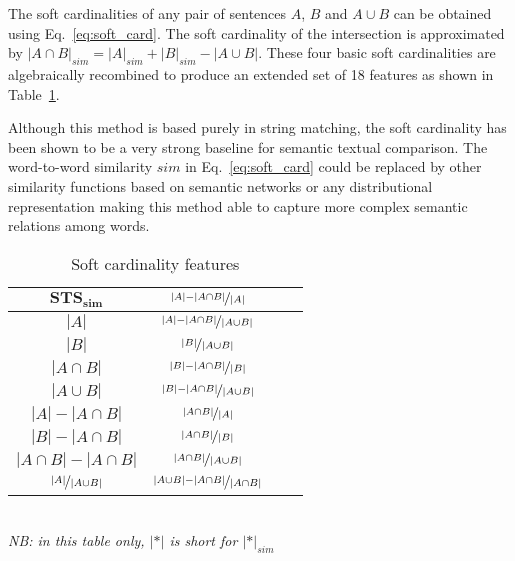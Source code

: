 The soft cardinalities of any pair of sentences $A$, $B$
and $A\cup B$ can be obtained using Eq.~\ref{eq:soft_card}. 
The soft cardinality of the intersection is approximated by 
$|A\cap B|_{sim}=|A|_{sim}+|B|_{sim}-|A\cup B|$.
These four basic soft cardinalities are algebraically recombined to produce
an extended set of 18 features as shown in Table~\ref{tab:features}. 

Although this method is based purely in string matching, the soft
cardinality has been shown to be a very strong baseline for semantic textual
comparison. The word-to-word similarity $sim$ in Eq.~\ref{eq:soft_card}
could be replaced by other similarity functions based on semantic networks
or any distributional representation making this method able to capture
more complex semantic relations among words. 

\begin{table}[t!]
\begin{centering}
\begin{tabular}{|c|c|c|c|}
\hline 
$\mathbf{STS_{sim}}$  & $\nicefrac{|A|-|A\cap B|}{|A|}$\tabularnewline
\hline 
{\small $|A|$} &  $\nicefrac{|A|-|A\cap B|}{|A\cup B|}$\tabularnewline
\hline 
{\small $|B|$} &  $\nicefrac{|B|}{|A\cup B|}$\tabularnewline
\hline 
{\small $|A\cap B|$} & $\nicefrac{|B|-|A\cap B|}{|B|}$\tabularnewline
\hline 
{\small $|A\cup B|$} &  $\nicefrac{|B|-|A\cap B|}{|A\cup B|}$\tabularnewline
\hline 
{\small $|A|-|A\cap B|$} & $\nicefrac{|A\cap B|}{|A|}$\tabularnewline
\hline 
{\small $|B|-|A\cap B|$}  & $\nicefrac{|A\cap B|}{|B|}$\tabularnewline
\hline 
{\small $|A\cap B|-|A\cap B|$} & $\nicefrac{|A\cap B|}{|A\cup B|}$\tabularnewline
\hline 
$\nicefrac{|A|}{|A\cup B|}$ & $\nicefrac{|A\cup B|-|A\cap B|}{|A\cap B|}$\tabularnewline
\hline
\end{tabular}
\\[1ex]
{\hfill\em\footnotesize NB: in this table only, $|*|$ is short for $|*|_{sim}$\hfill}
\end{centering}
\caption{Soft cardinality features\label{tab:features}}
\end{table}

